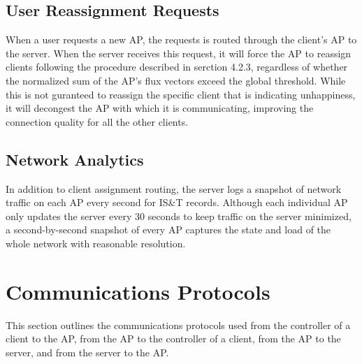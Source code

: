 \documentclass[10pt,journal,compsoc]{IEEEtran}
\begin{document}
		\subsection{User Reassignment Requests}
		When a user requests a new AP, the requests is routed through the client's AP to the server. When the server receives this request, it will force the AP to reassign clients following the procedure described in serction 4.2.3, regardless of whether the normalized sum of the AP's flux vectors exceed the global threshold. While this is not guranteed to reassign the specific client that is indicating unhappiness, it will decongest the AP with which it is communicating, improving the connection quality for all the other clients.
		
		\subsection{Network Analytics}
		In addition to client assignment routing, the server logs a snapshot of network traffic on each AP every second for IS\&T records. Although each individual AP only updates the server every 30 seconds to keep traffic on the server minimized, a second-by-second snapshot of every AP captures the state and load of the whole network with reasonable resolution.
		
		\section{Communications Protocols}
		This section outlines the communications protocols used from the controller of a client to the AP, from the AP to the controller of a client, from the AP to the server, and from the server to the AP.
		
\end{document}
